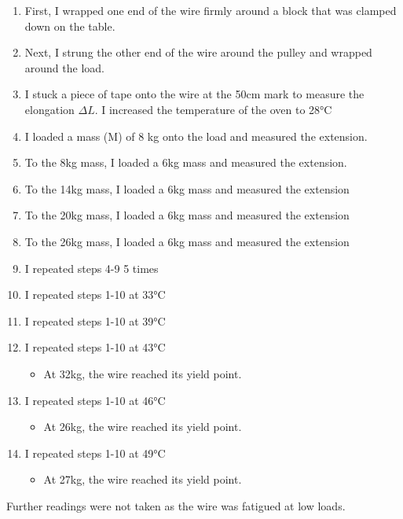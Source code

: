 \documentclass{article}
\begin{document}
\begin{enumerate}
    \item First, I wrapped one end of the wire firmly around a block that was clamped down on the table. 
    \item Next, I strung the other end of the wire around the pulley and wrapped around the load.
    \item I stuck a piece of tape onto the wire at the 50cm mark to measure the elongation $\Delta L$. I increased the temperature of the oven to 28°C
    \item I loaded a mass (M) of 8 kg onto the load and measured the extension.
    \item To the 8kg mass, I loaded a 6kg mass and measured the extension.
    \item To the 14kg mass, I loaded a 6kg mass and measured the extension
    \item To the 20kg mass, I loaded a 6kg mass and measured the extension
    \item To the 26kg mass, I loaded a 6kg mass and measured the extension
    \item I repeated steps 4-9 5 times
    \item I repeated steps 1-10 at 33°C
    \item I repeated steps 1-10 at 39°C
    \item I repeated steps 1-10 at 43°C
            \begin{itemize}
            \item At 32kg, the wire reached its yield point.
        \end{itemize}
    \item I repeated steps 1-10 at 46°C
                \begin{itemize}
            \item At 26kg, the wire reached its yield point.
        \end{itemize}
    \item I repeated steps 1-10 at 49°C
                \begin{itemize}
            \item At 27kg, the wire reached its yield point.
        \end{itemize}
\end{enumerate}
\vspace{-0.75cm}
\par{Further readings were not taken as the wire was fatigued at low loads.}
\vspace{-0.5cm}
\end{document}
